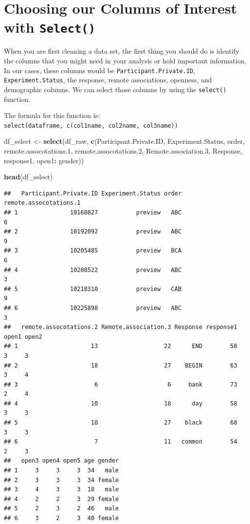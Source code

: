 \documentclass[
]{book}
\newenvironment{Shaded}{\begin{snugshade}}{\end{snugshade}}
\newcommand{\FloatTok}[1]{\textcolor[rgb]{0.00,0.00,0.81}{#1}}
\newcommand{\FunctionTok}[1]{\textcolor[rgb]{0.13,0.29,0.53}{\textbf{#1}}}
\newcommand{\NormalTok}[1]{#1}
\newcommand{\OtherTok}[1]{\textcolor[rgb]{0.56,0.35,0.01}{#1}}
\newcommand{\SpecialCharTok}[1]{\textcolor[rgb]{0.81,0.36,0.00}{\textbf{#1}}}
\begin{document}
\section{\texorpdfstring{Choosing our Columns of Interest with \texttt{Select()}}{Choosing our Columns of Interest with Select()}}\label{choosing-our-columns-of-interest-with-select}

When you are first cleaning a data set, the first thing you should do is identify the columns that you might need in your analysis or hold important information. In our cases, these columns would be \texttt{Participant.Private.ID}, \texttt{Experiment.Status}, the response, remote associations, openness, and demographic columns. We can select those columns by using the \texttt{select()} function.

The formula for this function is: \texttt{select(dataframe,\ c(col1name,\ col2name,\ col3name))}

\begin{Shaded}
\begin{Highlighting}[]
\NormalTok{df\_select }\OtherTok{\textless{}{-}} \FunctionTok{select}\NormalTok{(df\_raw, }\FunctionTok{c}\NormalTok{(Participant.Private.ID, Experiment.Status, order,}
\NormalTok{                              remote.assocotations}\FloatTok{.1}\NormalTok{, remote.assocotations}\FloatTok{.2}\NormalTok{,   Remote.association}\FloatTok{.3}\NormalTok{, Response, response1, open1}\SpecialCharTok{:}\NormalTok{ gender))}

\FunctionTok{head}\NormalTok{(df\_select)}
\end{Highlighting}
\end{Shaded}

\begin{verbatim}
##   Participant.Private.ID Experiment.Status order remote.assocotations.1
## 1               10168827           preview   ABC                      6
## 2               10192092           preview   ABC                      9
## 3               10205485           preview   BCA                      6
## 4               10208522           preview   ABC                      3
## 5               10218310           preview   CAB                      9
## 6               10225898           preview   ABC                      3
##   remote.assocotations.2 Remote.association.3 Response response1 open1 open2
## 1                     13                   22      END        50     3     3
## 2                     18                   27    BEGIN        63     3     4
## 3                      6                    6     bank        73     2     4
## 4                     10                   18      day        58     3     3
## 5                     18                   27    black        68     3     3
## 6                      7                   11   common        54     2     3
##   open3 open4 open5 age gender
## 1     3     3     3  34   male
## 2     3     3     3  34 female
## 3     4     3     3  18   male
## 4     2     2     3  29 female
## 5     2     3     2  46   male
## 6     3     2     3  40 female
\end{verbatim}
\end{document}
